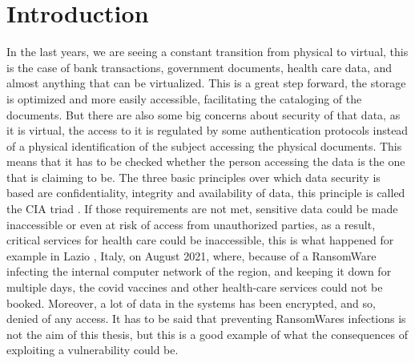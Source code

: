 \chapter{Introduction}
\label{chap:introduction}
In the last years, we are seeing a constant transition from physical to virtual, this is the case of bank transactions, government documents, health care data, and almost anything that can be virtualized. This is a great step forward, the storage is optimized and more easily accessible, facilitating the cataloging of the documents. But there are also some big concerns about security of that data, as it is virtual, the access to it is regulated by some authentication protocols instead of a physical identification of the subject accessing the physical documents. This means that it has to be checked whether the person accessing the data is the one that is claiming to be. The three basic principles over which data security is based are confidentiality, integrity and availability of data, this principle is called the CIA triad \cite{cia_triad}.
If those requirements are not met, sensitive data could be made inaccessible or even at risk of access from unauthorized parties, as a result, critical services for health care could be inaccessible, this is what happened for example in Lazio \cite{lazio_hacker_0,lazio_hacker_1}, Italy, on August 2021, where, because of a RansomWare infecting the internal computer network of the region, and keeping it down for multiple days, the covid vaccines and other health-care services could not be booked. Moreover, a lot of data in the systems has been encrypted, and so, denied of any access. It has to be said that preventing RansomWares infections is not the aim of this thesis, but this is a good example of what the consequences of exploiting a vulnerability could be. 

